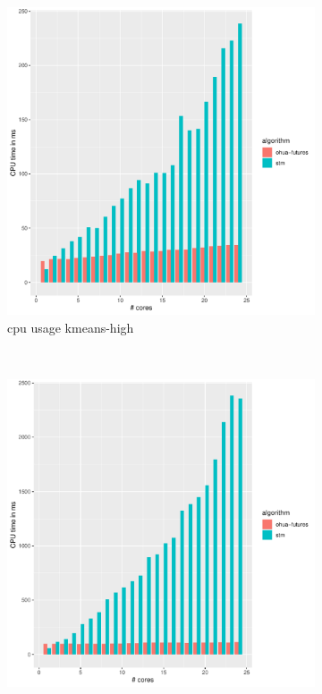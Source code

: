 \begin{figure}
    \begin{subfigure}[t]{.32\textwidth}
        \includegraphics[width=\textwidth,keepaspectratio]{gfx/results/kmeans/kmeans-high_cpu}
        \caption{cpu usage kmeans-high}%
    \end{subfigure}%
    ~
    \begin{subfigure}[t]{.32\textwidth}
        \includegraphics[width=\textwidth,keepaspectratio]{gfx/results/kmeans/kmeans-high+_cpu}

\end{subfigure}
\end{figure}
